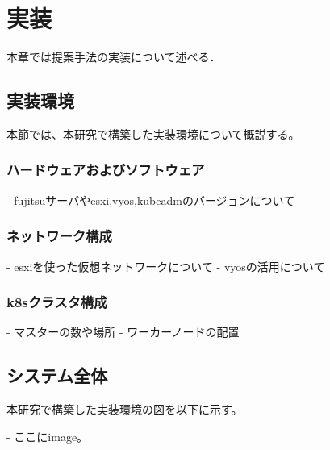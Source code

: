 \chapter{実装}
\label{implementation}

本章では提案手法の実装について述べる．

\section{実装環境}
本節では、本研究で構築した実装環境について概説する。

\subsection{ハードウェアおよびソフトウェア}
- fujitsuサーバやesxi,vyos,kubeadmのバージョンについて

\subsection{ネットワーク構成}
- esxiを使った仮想ネットワークについて
- vyosの活用について

\subsection{k8sクラスタ構成}
- マスターの数や場所
- ワーカーノードの配置

\section{システム全体}
本研究で構築した実装環境の図を以下に示す。

- ここにimage。


